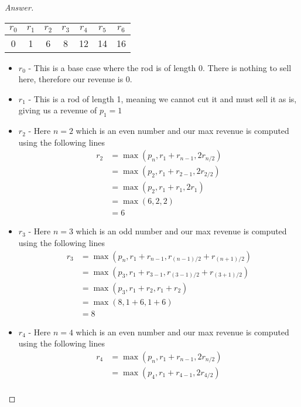\documentclass[11pt]{article}
\theoremstyle{definition}
\theoremstyle{definition}
\theoremstyle{definition}
\begin{document}
\begin{proof}[Answer]
\begin{center}
	\begin{tabular}{|c|c|c|c|c|c|c|}
	\hline
	$r_0$ & $r_{1}$ & $r_{2}$ & $r_{3}$ & $r_{4}$ & $r_{5}$ & $r_{6}$ \\ \hline
      0  & 1 & 6& 8& 12& 14& 16\\ \hline
	\end{tabular}
\end{center}
\begin{itemize}
    \item $r_0$ - This is a base case where the rod is of length 0. There is nothing to sell here, therefore our revenue is 0. 
    \item $r_1$ - This is a rod of length 1, meaning we cannot cut it and must sell it as is, giving us a revenue of $p_1 = 1$
    \item $r_2$ - Here $n=2$ which is an even number and our max revenue is computed using the following lines 
        \begin{align*}
            r_2 &= \max(p_n, r_1 + r_{n-1}, 2r_{n/2}) \\
            &= \max(p_2, r_1 + r_{2-1}, 2r_{2/2}) \\
            &= \max(p_2, r_1 + r_{1}, 2r_{1}) \\
            &= \max(6, 2, 2) \\
            &= 6
        \end{align*}
    \item $r_3$ - Here $n=3$ which is an odd number and our max revenue is computed using the following lines 
        \begin{align*}
            r_3 &= \max(p_n, r_1 + r_{n-1}, r_{(n-1)/2} + r_{(n+1)/2}) \\
            &= \max(p_3, r_1 + r_{3-1}, r_{(3-1)/2} + r_{(3+1)/2}) \\
            &= \max(p_3, r_1 + r_{2}, r_{1} + r_{2}) \\
             &= \max(8, 1 + 6, 1 + 6) \\
             &= 8
        \end{align*}
    \item $r_4$ - Here $n=4$ which is an even number and our max revenue is computed using the following lines 
        \begin{align*}
            r_4 &= \max(p_n, r_1 + r_{n-1}, 2r_{n/2}) \\
             &= \max(p_4, r_1 + r_{4-1}, 2r_{4/2}) \\

\end{align*}
\end{itemize}
\end{proof}
\end{document}
